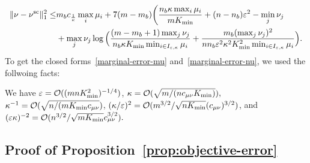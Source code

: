 \begin{align*}
\norm{{\nu} -{\nu}^{\text{sc}}}^2_1 \leq & m_bc_{\frac 1\kappa}\max_{i} \mu_i + 7(m-m_b)\bigg(\frac{n_b\kappa\max_{i}\mu_i}{mK_{\min}} + (n- n_b) \varepsilon^2 - \min_{j}\nu_j\\
&+ \max_{j} \nu_j\log\Big(\frac{(m-m_b+ 1)\max_{j} \nu_j}{n_b\kappa K_{\min}\min_{i \in I_{\varepsilon,\kappa}}\mu_i} + \frac{m_b(\max_{j} \nu_j)^2}{nn_b\varepsilon^2\kappa^2K_{\min}^2\min_{i \in I_{\varepsilon,\kappa}}\mu_i}\Big).%
\end{align*}
To get the closed forms~\eqref{marginal-error-mu} and~\eqref{marginal-error-nu}, we used the follwoing facts:
\begin{remark}
\label{rem:orders_of_epsilonappa}
 We have 
$\varepsilon = \mathcal{O}((mnK_{\min}^2)^{-1/4})$, $\kappa= \mathcal{O}(\sqrt{m/(nc_{\mu\nu}K_{\min})}),$ $\kappa^{-1} = \mathcal{O}(\sqrt{n/(mK_{\min}c_{\mu\nu}})$, $(\kappa/\varepsilon)^2 = \mathcal{O}( m^{3/2} / \sqrt{nK_{\min}}(c_{\mu\nu})^{3/2})$, and $(\varepsilon\kappa)^{-2} = \mathcal{O}(n^{3/2}/\sqrt{mK_{\min}}c^{3/2}_{\mu\nu}).$
\end{remark}

\subsection{Proof of Proposition~\ref{prop:objective-error}}

